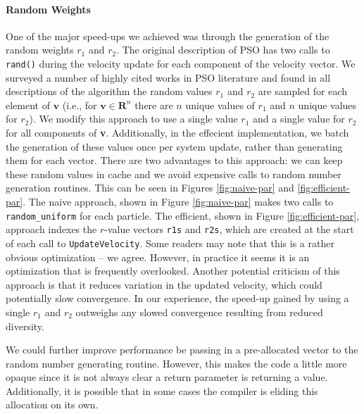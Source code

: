 \paragraph{Random Weights} One of the major speed-ups we achieved was through
the generation of the random weights $r_1$ and $r_2$. The original description of
PSO \cite{pso} has two calls to \texttt{rand()} during the velocity update for each
component of the velocity vector. We surveyed a number of highly cited works in
PSO literature \cite{pso-development, pso-overview, pso-tutorial} and found in
all descriptions of the algorithm the random values $r_1$ and $r_2$ are sampled
for each element of $\textbf{v}$ (i.e., for $\textbf{v}\in\mathbf{R}^n$ there
are $n$ unique values of $r_1$ and $n$ unique values for $r_2$). We modify this
approach to use a single value $r_1$ and a single value for $r_2$ for all
components of \textbf{v}. Additionally, in the effecient implementation, we batch
the generation of these values once per system update, rather than generating
them for each vector.
There are two advantages to this approach: we can keep
these random values in cache and we avoid expensive calls to random number
generation routines. This can be seen in Figures \ref{fig:naive-par} and
\ref{fig:efficient-par}. The naive approach, shown in Figure \ref{fig:naive-par}
makes two calls to
\texttt{random\_uniform} for each particle. The efficient, shown in Figure
\ref{fig:efficient-par},
approach indexes the $r$-value vectors \texttt{r1s} and \texttt{r2s}, which are
created at the start of each call to \texttt{UpdateVelocity}. Some readers may
note that this is a rather obvious optimization -- we agree. However, in
practice it seems it is an optimization that is frequently overlooked.
Another potential criticism of this approach is that it reduces variation in the
updated velocity, which could potentially slow convergence. In our experience,
the speed-up gained by using a single $r_1$ and $r_2$ outweighs any slowed
convergence resulting from reduced diversity.\par
We could further improve performance be passing in a pre-allocated vector to the
random number generating routine. However, this makes the code a little more
opaque since it is not always clear a return parameter is returning a
value. Additionally, it is possible that in some cases the compiler is eliding
this allocation on its own.

